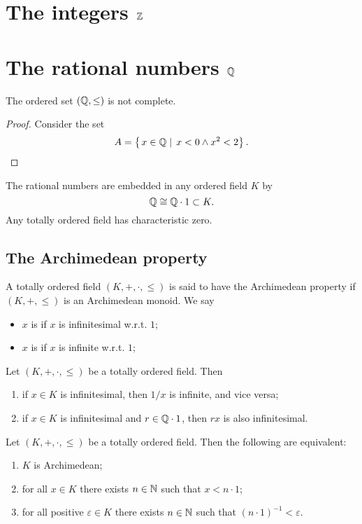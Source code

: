 \chapter{The integers  $\mathbb{Z}$}



\chapter{The rational numbers $\mathbb{Q}$}

\begin{proposition}
The ordered set $(\mathbb{Q},\leq)$ is not complete.
\end{proposition}
\begin{proof}
Consider the set
\[ A = \left\{\left. x\in\mathbb{Q} \;\right|\; x<0\land x^2<2 \right\}. \]
\end{proof}

\begin{proposition}
The rational numbers are embedded in any ordered field $K$ by
\[ \mathbb{Q} \cong \mathbb{Q}\cdot 1 \subset K. \]
Any totally ordered field has characteristic zero.
\end{proposition}

\section{The Archimedean property}
\begin{definition}
A totally ordered field $(K,+,\cdot, \leq)$ is said to have the Archimedean property if $(K,+,\leq)$ is an Archimedean monoid. We say
\begin{itemize}
\item $x$ is  if $x$ is infinitesimal w.r.t. $1$;
\item $x$ is  if $x$ is infinite w.r.t. $1$;
\end{itemize}
\end{definition}

\begin{lemma}
Let $(K,+,\cdot, \leq)$ be a totally ordered field. Then
\begin{enumerate}
\item if $x\in K$ is infinitesimal, then $1/x$ is infinite, and vice versa;
\item if $x\in K$ is infinitesimal and $r\in \mathbb{Q}\cdot 1$, then $rx$ is also infinitesimal.
\end{enumerate}
\end{lemma}

\begin{proposition}
Let $(K,+,\cdot, \leq)$ be a totally ordered field. Then the following are equivalent:
\begin{enumerate}
\item $K$ is Archimedean;
\item for all $x\in K$ there exists $n\in\mathbb{N}$ such that $x < n\cdot 1$;
\item for all positive $\varepsilon\in K$ there exists $n\in\mathbb{N}$ such that $(n\cdot 1)^{-1}< \varepsilon$.
\end{enumerate}
\end{proposition}

